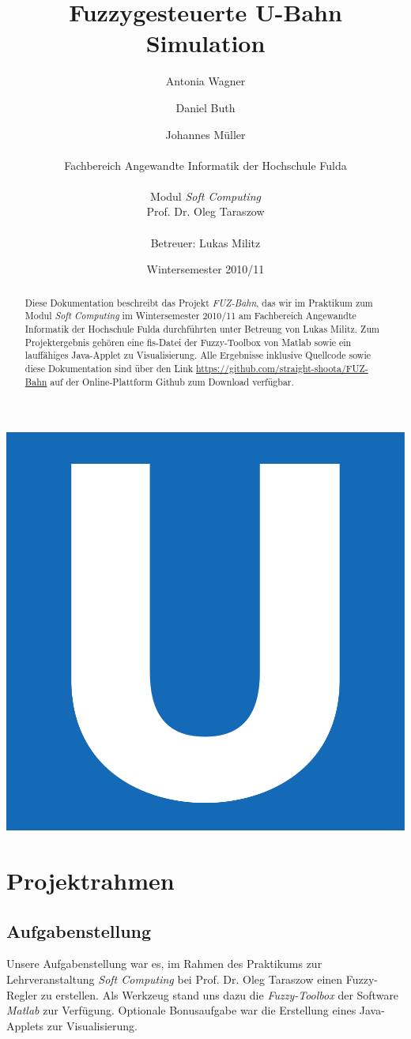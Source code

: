 \documentclass[10pt,a4paper]{article}
\author{Antonia Wagner \and Daniel Buth \and Johannes Müller \\ \\
Fachbereich Angewandte Informatik der Hochschule Fulda\\ \\
Modul \textit{Soft Computing}\\
Prof. Dr. Oleg Taraszow\\ \\
Betreuer: Lukas Militz
}
\title{Fuzzygesteuerte U-Bahn Simulation}
\date{Wintersemester 2010/11}
\begin{document}
\maketitle
\includegraphics[scale=.3]{ubahnlogo}

\newpage 

\tableofcontents

\begin{abstract}
Diese Dokumentation beschreibt das Projekt \textit{FUZ-Bahn}, das wir im Praktikum zum Modul \textit{Soft Computing} im Wintersemester 2010/11 am Fachbereich Angewandte Informatik der Hochschule Fulda durchführten unter Betreung von Lukas Militz.
Zum Projektergebnis gehören eine fis-Datei der Fuzzy-Toolbox von Matlab sowie ein lauffähiges Java-Applet zu Visualisierung. Alle Ergebnisse inklusive Quellcode sowie diese Dokumentation sind über den Link \url{https://github.com/straight-shoota/FUZ-Bahn} auf der Online-Plattform Github zum Download verfügbar.
\end{abstract}

\newpage 

\section{Projektrahmen}
\subsection{Aufgabenstellung}
Unsere Aufgabenstellung war es, im Rahmen des Praktikums zur Lehrveranstaltung \textit{Soft Computing} bei Prof. Dr. Oleg Taraszow einen Fuzzy-Regler zu erstellen.
Als Werkzeug stand uns dazu die \textit{Fuzzy-Toolbox} der Software \textit{Matlab} zur Verfügung.
Optionale Bonusaufgabe war die Erstellung eines Java-Applets zur Visualisierung.
\end{document}
